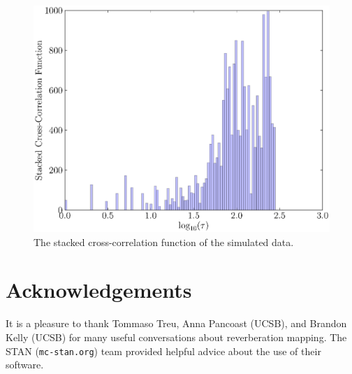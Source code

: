 \documentclass[useAMS,usenatbib]{mn2e}
\begin{document}
\begin{figure}
\begin{center}
\includegraphics[scale=0.4]{Figures/ccf.eps}
\caption{The stacked cross-correlation function of the simulated data.
\label{fig:ccf}}
\end{center}
\end{figure}



\section*{Acknowledgements}
It is a pleasure to thank Tommaso Treu, Anna Pancoast (UCSB), and
Brandon Kelly (UCSB) for many
useful conversations about reverberation mapping. The STAN ({\tt mc-stan.org})
team provided helpful advice about the use of their software.
\end{document}
